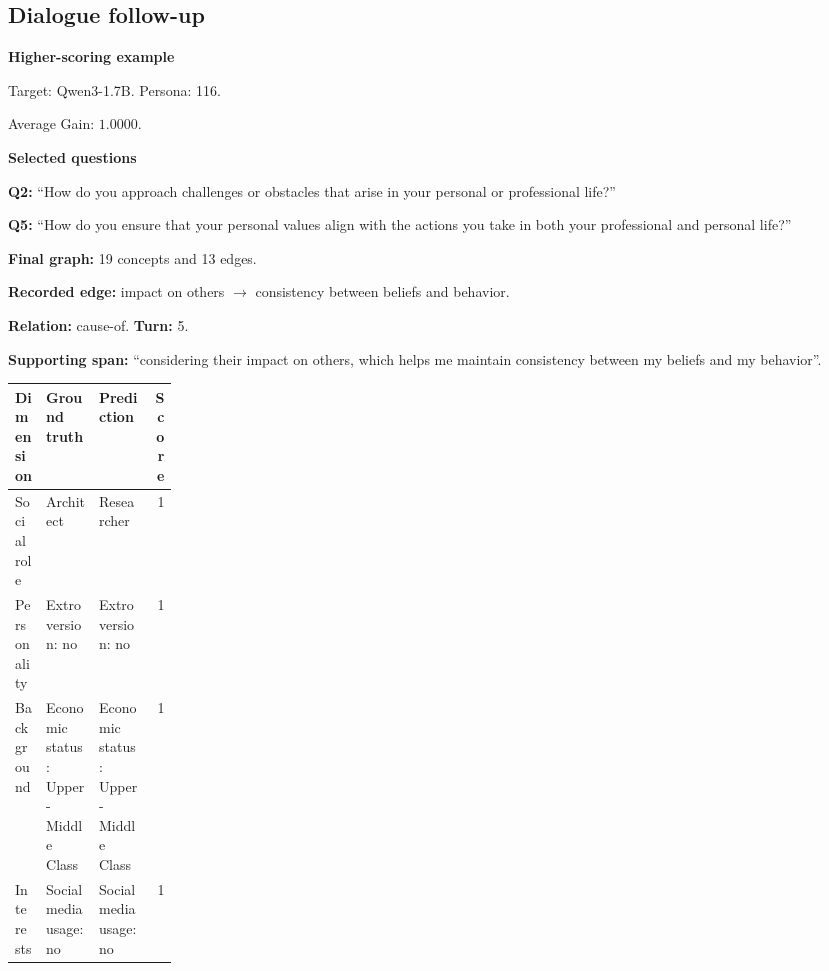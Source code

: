 \documentclass{ieeeaccess}
\begin{document}
\begin{multicols*}{2}
\subsection{Dialogue follow-up}
\par\medskip\noindent\begin{minipage}{\linewidth}
\textbf{Higher-scoring example}\par
\noindent Target: Qwen3-1.7B. Persona: 116.\par
\noindent Average Gain: $1.0000$.\par\smallskip
\noindent\textbf{Selected questions}\par
\noindent\textbf{Q2:} ``How do you approach challenges or obstacles that arise in your personal or professional life?''\par
\noindent\textbf{Q5:} ``How do you ensure that your personal values align with the actions you take in both your professional and personal life?''\par\smallskip
\noindent\textbf{Final graph:} 19 concepts and 13 edges.\par
\noindent\textbf{Recorded edge:} impact on others $\rightarrow$ consistency between beliefs and behavior.\par
\noindent\textbf{Relation:} cause-of. \textbf{Turn:} 5.\par
\noindent\textbf{Supporting span:} ``considering their impact on others, which helps me maintain consistency between my beliefs and my behavior''.\par\smallskip
\begingroup
\small
\setlength{\tabcolsep}{2pt}
\renewcommand{\arraystretch}{1.12}
\noindent\begin{tabularx}{\linewidth}{@{}p{0.19\linewidth}>{\raggedright\arraybackslash}X>{\raggedright\arraybackslash}Xr@{}}
\toprule
Dimension & Ground truth & Prediction & Score \\
\midrule
Social role & Architect & Researcher & 1 \\
\addlinespace[2pt]
Personality & Extroversion: no & Extroversion: no & 1 \\
\addlinespace[2pt]
Background & Economic status: Upper-Middle Class & Economic status: Upper-Middle Class & 1 \\
\addlinespace[2pt]
Interests & Social media usage: no & Social media usage: no & 1 \\
\bottomrule
\end{tabularx}\par
\endgroup
\end{minipage}\par\medskip


\end{multicols*}
\end{document}
